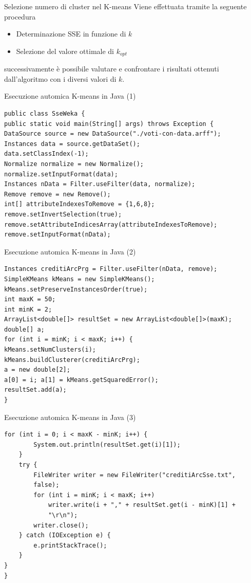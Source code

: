 \documentclass{beamer}
\begin{document}
\begin{frame}{Selezione numero di cluster nel K-means} 
    Viene effettuata tramite la seguente procedura
    \begin{itemize}
      \item Determinazione SSE in funzione di $k$
      \item Selezione del valore ottimale di $k_{opt}$ 
    \end{itemize} 
    successivamente è possibile valutare e confrontare i risultati ottenuti dall'algoritmo
    con i diversi valori di $k$.
\end{frame}

\begin{frame}[fragile]{Esecuzione automica K-means in Java (1)}
\begin{lstlisting}[basicstyle=\tiny,style = R]
public class SseWeka {
public static void main(String[] args) throws Exception {
DataSource source = new DataSource("./voti-con-data.arff");
Instances data = source.getDataSet();
data.setClassIndex(-1);
Normalize normalize = new Normalize();
normalize.setInputFormat(data);
Instances nData = Filter.useFilter(data, normalize);
Remove remove = new Remove();
int[] attributeIndexesToRemove = {1,6,8};
remove.setInvertSelection(true);
remove.setAttributeIndicesArray(attributeIndexesToRemove);
remove.setInputFormat(nData);
\end{lstlisting}
\end{frame}

\begin{frame}[fragile]{Esecuzione automica K-means in Java (2)}
\begin{lstlisting}[basicstyle=\tiny,style = R]
Instances creditiArcPrg = Filter.useFilter(nData, remove);
SimpleKMeans kMeans = new SimpleKMeans();
kMeans.setPreserveInstancesOrder(true);
int maxK = 50;
int minK = 2;
ArrayList<double[]> resultSet = new ArrayList<double[]>(maxK);
double[] a;
for (int i = minK; i < maxK; i++) {
kMeans.setNumClusters(i);
kMeans.buildClusterer(creditiArcPrg);
a = new double[2];
a[0] = i; a[1] = kMeans.getSquaredError();
resultSet.add(a);
}
\end{lstlisting}
\end{frame}

\begin{frame}[fragile]{Esecuzione automica K-means in Java (3)}
\begin{lstlisting}[basicstyle=\tiny,style = R]
	for (int i = 0; i < maxK - minK; i++) {
		System.out.println(resultSet.get(i)[1]);
	}
	try {
		FileWriter writer = new FileWriter("creditiArcSse.txt",
		false);
		for (int i = minK; i < maxK; i++)
			writer.write(i + "," + resultSet.get(i - minK)[1] +
			"\r\n");
		writer.close();
	} catch (IOException e) {
		e.printStackTrace();
	}
}
}
\end{lstlisting}
\end{frame}
\end{document}
